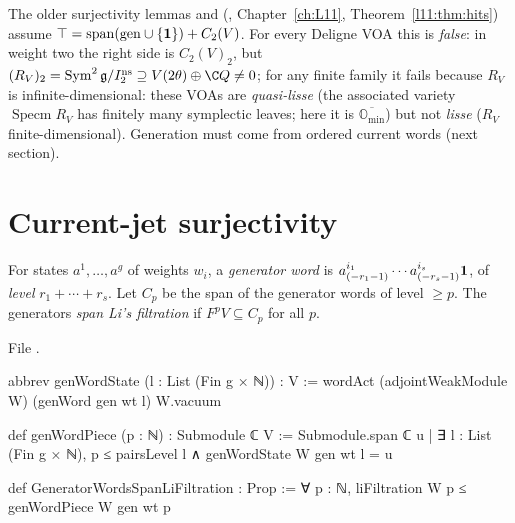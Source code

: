 \begin{warning}[title={Dead end: the ``span plus $C_2$'' generation criterion}]
The older surjectivity lemmas  and
 (,
Chapter~\ref{ch:L11}, Theorem~\ref{l11:thm:hits}) assume
$\top=\operatorname{span}(\mathrm{gen}\cup\{\mathbf 1\})+C_2(V)$. For every Deligne VOA this is
\emph{false}: in weight two the right side is $C_2(V)_2$, but $(R_V)_2=\operatorname{Sym}^2\ltwentyfourg/\ltwentyfourIns\supseteq
V(2\theta)\oplus\C Q\neq0$; for any finite family it fails because $R_V$ is infinite-dimensional: these VOAs are
\emph{quasi-lisse} (the associated variety $\operatorname{Specm}R_V$ has finitely many symplectic leaves; here it is
$\overline{\mathbb O_{\min}}$) but not \emph{lisse} ($R_V$ finite-dimensional). Generation must come from ordered current
words (next section).
\end{warning}

\section{Current-jet surjectivity}\label{l24:sec:jets}

\begin{definition}\label{l24:def:genword}
For states $a^1,\dots,a^g$ of weights $w_i$, a \emph{generator word} is
$a^{i_1}_{(-r_1-1)}\cdots a^{i_s}_{(-r_s-1)}\mathbf 1$, of \emph{level} $r_1+\cdots+r_s$. Let $C_p$ be the span of
the generator words of level $\ge p$. The generators \emph{span Li's filtration} if $F^pV\subseteq C_p$ for
all $p$.
\end{definition}
\noindent File .
\begin{leancode}
abbrev genWordState (l : List (Fin g × ℕ)) : V :=
  wordAct (adjointWeakModule W) (genWord gen wt l) W.vacuum

def genWordPiece (p : ℕ) : Submodule ℂ V :=
  Submodule.span ℂ {u | ∃ l : List (Fin g × ℕ), p ≤ pairsLevel l ∧ genWordState W gen wt l = u}

def GeneratorWordsSpanLiFiltration : Prop :=
  ∀ p : ℕ, liFiltration W p ≤ genWordPiece W gen wt p
\end{leancode}

